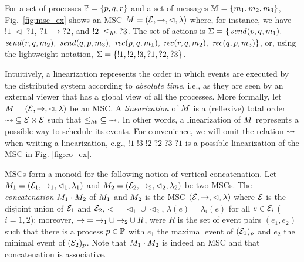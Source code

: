\begin{example}
    For a set of processes $\mathbb{P} = \{p,q,r\}$ and a set of messages $\mathbb{M} = \{m_1, m_2, m_3 \}$, Fig.~\ref{fig:msc_ex} shows an MSC 
    $M = (\mathcal{E}, \to, \lhd, \lambda)$
    where, for instance, we have
  $!1\;\lhd\;?1$, $?1\;\to\;?2$, and $!2\;\leq_{hb}\;?3$. The set of actions is $\Sigma = \{$$\mathit{send}(p, q, m_1),$ $\mathit{send}(r, q, m_2),$  $\mathit{send}(q, p, m_3),$ $\mathit{rec}(p, q, m_1),$ $\mathit{rec}(r, q, m_2),$ $\mathit{rec}(q, p, m_3)\}$, or, using the lightweight notation, $\Sigma = \{!1, !2, !3, ?1, ?2, ?3 \}$.
\end{example}

Intuitively, a linearization represents the order in which events are executed by the distributed system according to \emph{absolute time}, i.e., as they are seen by an external viewer that has a global view of all the processes. More formally, let $M = (\mathcal{E},\to,\lhd,\lambda)$ be an MSC.
A \emph{linearization} of $M$ is a (reflexive) total order ${\rightsquigarrow} \subseteq \mathcal{E} \times \mathcal{E}$ such that ${\leq_{hb}} \subseteq {\rightsquigarrow}$. In other words, a linearization of $M$ represents a possible way to schedule its events. For convenience, we will omit the relation $\rightsquigarrow$ when writing a linearization, e.g., $!1\;!3\;!2\;?2\;?3\;?1$ is a possible linearization of the MSC in Fig. \ref{fig:co_ex}.

MSCs form a monoid for the following notion of vertical concatenation.
Let $M_1 = (\mathcal{E}_1,\to_1,\lhd_1,\lambda_1)$ and
$M_2 = (\mathcal{E}_2,\to_2,\lhd_2,\lambda_2)$ be two MSCs.
The \emph{concatenation} $M_1 \cdot M_2$ of $M_1$ and $M_2$ is the MSC 
$(\mathcal{E},\to,\lhd,\lambda)$ where $\mathcal{E}$ is the disjoint 
union of $\mathcal{E}_1$ and $\mathcal{E}_2$,
${\lhd}  = {\lhd_1} \cup {\lhd_2}$, $\lambda(e)=\lambda_i(e)$ for all $e\in \mathcal{E}_i$ ($i=1,2$); 
moreover, ${\to} = {\to_1} \cup {\to_2} \cup R$,
were $R$ is the set of event pairs $(e_1,e_2)$ 
such that there is a process $p \in \mathbb{P}$ with $e_1$ the maximal event of 
$(\mathcal{E}_1)_p$ and $e_2$ the minimal event of
$(\mathcal{E}_2)_p$.
Note that $M_1 \cdot M_2$ is indeed an MSC and that
concatenation is associative.


